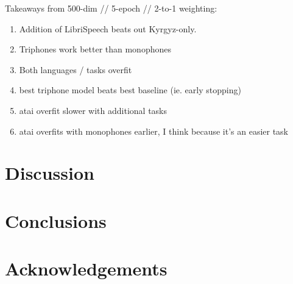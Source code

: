 \documentclass[a4paper]{article}
\begin{document}
Takeaways from 500-dim // 5-epoch // 2-to-1 weighting:

\begin{enumerate}
\item Addition of LibriSpeech beats out Kyrgyz-only.
\item Triphones work better than monophones
\item Both languages / tasks overfit
\item best triphone model beats best baseline (ie. early stopping)
\item atai overfit slower with additional tasks
\item atai overfits with monophones earlier, I think because it's an easier task
\end{enumerate}




\section{Discussion}


\section{Conclusions}

\section{Acknowledgements}






\end{document}
